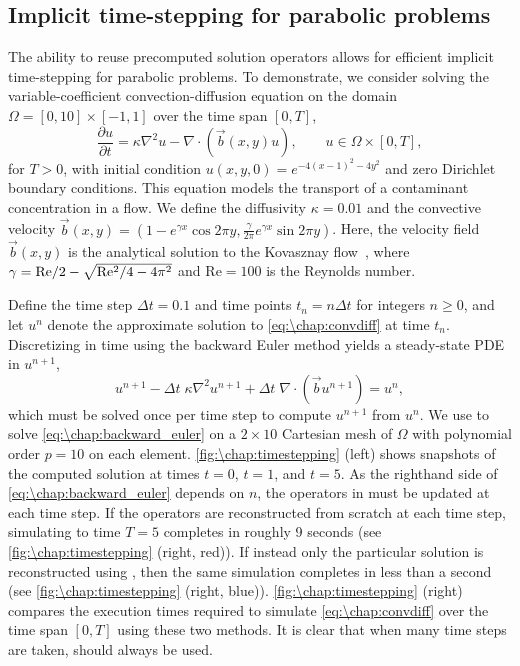 \subsection{Implicit time-stepping for parabolic problems}

The ability to reuse precomputed solution operators allows for efficient implicit time-stepping for parabolic problems. To demonstrate, we consider solving the variable-coefficient convection-diffusion equation on the domain $\Omega = [0,10] \times [-1,1]$ over the time span $[0,T]$,
\begin{equation}\label{eq:\chap:convdiff}
\frac{\partial u}{\partial t} = \kappa \nabla^2 u - \nabla \cdot \left(\vec{b}(x,y) u\right), \qquad u \in \Omega \times [0,T],
\end{equation}
for $T>0$, with initial condition $u(x,y,0) = e^{-4(x-1)^2-4y^2}$ and zero Dirichlet boundary conditions. This equation models the transport of a contaminant concentration in a flow. We define the diffusivity $\kappa = 0.01$ and the convective velocity $\vec{b}(x,y) = (1 - e^{\gamma x} \cos 2\pi y, \tfrac{\gamma}{2\pi} e^{\gamma x} \sin 2\pi y)$. Here, the velocity field $\vec{b}(x,y)$ is the analytical solution to the Kovasznay flow~\cite{Kovasznay_48_01}, where $\gamma = \mathrm{Re}/2 - \sqrt{\smash{\mathrm{Re}}^2/4 - 4\pi^2}$ and $\mathrm{Re}=100$ is the Reynolds number.

Define the time step $\Delta t = 0.1$ and time points $t_n = n \Delta t$ for integers $n \geq 0$, and let $u^n$ denote the approximate solution to \cref{eq:\chap:convdiff} at time $t_n$. Discretizing in time using the backward Euler method yields a steady-state PDE in $u^{n+1}$,
\begin{equation}\label{eq:\chap:backward_euler}
u^{n+1} - \Delta t \; \kappa \nabla^2 u^{n+1} + \Delta t \; \nabla\cdot\left(\vec{b}u^{n+1} \right) = u^n,
\end{equation}
which must be solved once per time step to compute $u^{n+1}$ from $u^n$. We use \ultraSEM to solve \cref{eq:\chap:backward_euler} on a $2 \times 10$ Cartesian mesh of $\Omega$ with polynomial order $p=10$ on each element. \cref{fig:\chap:timestepping} (left) shows snapshots of the computed solution at times $t=0$, $t=1$, and $t=5$. As the righthand side of \cref{eq:\chap:backward_euler} depends on $n$, the operators in \ultraSEM must be updated at each time step. If the operators are reconstructed from scratch at each time step, simulating to time $T=5$ completes in roughly 9 seconds (see \cref{fig:\chap:timestepping} (right, red)). If instead only the particular solution is reconstructed using , then the same simulation completes in less than a second (see \cref{fig:\chap:timestepping} (right, blue)). \cref{fig:\chap:timestepping} (right) compares the execution times required to simulate \cref{eq:\chap:convdiff} over the time span $[0,T]$ using these two methods. It is clear that when many time steps are taken,  should always be used.

